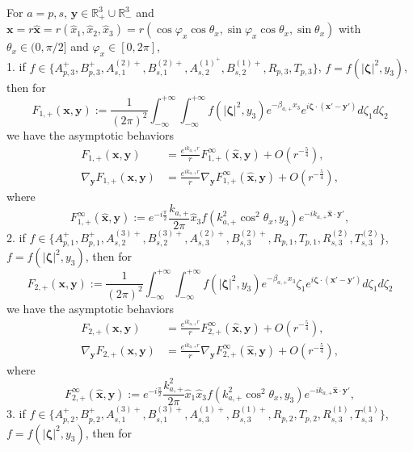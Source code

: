 \documentclass[final,reqno]{siamltex}
\newcommand{\mat}{\mathbb}
\newcommand{\R}{{\mat R}}
\begin{document}
\begin{theorem}\label{thm3.7}
  For $a=p,s$, $\mathbf{y}\in\R^3_+\cup\R^3_-$ and $\mathbf{x}=r\mathbf{\hat x}=r(\hat x_1,\hat x_2,\hat x_3)=r(\cos\varphi_x\cos\theta_x,\sin\varphi_x\cos\theta_x,\sin\theta_x)$ with $\theta_x\in(0,\pi/2]$ and $\varphi_x\in[0,2\pi]$, \\
  1. if $f\in\{A_{p,3}^+,B_{p,3}^+,A_{s,1}^{(2)+},B_{s,1}^{(2)+},A_{s,2}^{(1)^+},B_{s,2}^{(1)+},R_{p,3},T_{p,3}\}$, $f=f(|\boldsymbol{\zeta}|^2,y_3)$,  then for 
  $$
    F_{1,+}(\mathbf{x},\mathbf{y}):=\frac{1}{(2\pi)^2}\int_{-\infty}^{+\infty}\int_{-\infty}^{+\infty}f(|\boldsymbol{\zeta}|^2,y_3)e^{-\beta_{a,+}x_3}e^{i\boldsymbol{\zeta}\cdot(\mathbf{x}'-\mathbf{y}')}d\zeta_1d\zeta_2
  $$
  we have the asymptotic behaviors 
  \begin{align*}
    F_{1,+}(\mathbf{x},\mathbf{y})&=\frac{e^{ik_{a,+}r}}{r}F_{1,+}^\infty(\hat{\mathbf{x}},\mathbf{y})+O(r^{-\frac{5}{4}}), \\ 
    \nabla_{\mathbf{y}}F_{1,+}(\mathbf{x},\mathbf{y})&=\frac{e^{ik_{a,+}r}}{r}\nabla_{\mathbf{y}}F_{1,+}^\infty(\hat{\mathbf{x}},\mathbf{y})+O(r^{-\frac{5}{4}}), 
  \end{align*}
  where 
  $$
    F_{1,+}^\infty(\hat{\mathbf{x}},\mathbf{y}):=e^{-i\frac{\pi}{2}}\frac{k_{a,+}}{2\pi}\hat x_3f(k_{a,+}^2\cos^2\theta_x,y_3)e^{-ik_{a,+}\hat{\mathbf{x}}\cdot\mathbf{y}'}, 
  $$
  2. if $f\in\{A_{p,1}^+,B_{p,1}^+,A_{s,2}^{(3)+},B_{s,2}^{(3)+},A_{s,3}^{(2)+},B_{s,3}^{(2)+},R_{p,1},T_{p,1},R_{s,3}^{(2)},T_{s,3}^{(2)}\}$, $f=f(|\boldsymbol{\zeta}|^2,y_3)$,  then for 
  $$
    F_{2,+}(\mathbf{x},\mathbf{y}):=\frac{1}{(2\pi)^2}\int_{-\infty}^{+\infty}\int_{-\infty}^{+\infty}f(|\boldsymbol{\zeta}|^2,y_3)e^{-\beta_{a,+}x_3}\zeta_1e^{i\boldsymbol{\zeta}\cdot(\mathbf{x}'-\mathbf{y}')}d\zeta_1d\zeta_2
  $$
  we have the asymptotic behaviors 
  \begin{align*}
  F_{2,+}(\mathbf{x},\mathbf{y})&=\frac{e^{ik_{a,+}r}}{r}F_{2,+}^\infty(\hat{\mathbf{x}},\mathbf{y})+O(r^{-\frac{5}{4}}), \\ 
  \nabla_{\mathbf{y}}F_{2,+}(\mathbf{x},\mathbf{y})&=\frac{e^{ik_{a,+}r}}{r}\nabla_{\mathbf{y}}F_{2,+}^\infty(\hat{\mathbf{x}},\mathbf{y})+O(r^{-\frac{5}{4}}), 
  \end{align*}
  where 
  $$
    F_{2,+}^\infty(\hat{\mathbf{x}},\mathbf{y}):=e^{-i\frac{\pi}{2}}\frac{k_{a,+}^2}{2\pi}\hat x_1\hat x_3f(k_{a,+}^2\cos^2\theta_x,y_3)e^{-ik_{a,+}\hat{\mathbf{x}}\cdot\mathbf{y}'}, 
  $$
  3. if $f\in\{A_{p,2}^+,B_{p,2}^+,A_{s,1}^{(3)+},B_{s,1}^{(3)+},A_{s,3}^{(1)+},B_{s,3}^{(1)+},R_{p,2},T_{p,2},R_{s,3}^{(1)},T_{s,3}^{(1)}\}$, $f=f(|\boldsymbol{\zeta}|^2,y_3)$,  then for 

\end{theorem}
\end{document}
